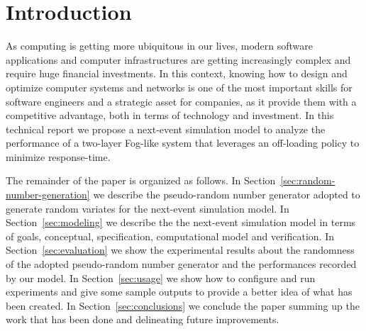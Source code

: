 \section{Introduction}
\label{sec:introduction}


As computing is getting more ubiquitous in our lives, modern software applications and computer infrastructures are getting increasingly complex and require huge financial investments.
%
In this context, knowing how to design and optimize computer systems and networks is one of the most important skills for software engineers and a strategic asset for companies, as it provide them with a competitive advantage, both in terms of technology and investment.
%
In this technical report we propose a next-event simulation model to analyze the performance of a two-layer Fog-like system that leverages an off-loading policy to minimize response-time.


The remainder of the paper is organized as follows.
%
In Section~\ref{sec:random-number-generation} we describe the pseudo-random number generator adopted to generate random variates for the next-event simulation model.
%
In Section~\ref{sec:modeling} we describe the the next-event simulation model in terms of goals, conceptual, specification, computational model and verification.
%
In Section~\ref{sec:evaluation} we show the experimental results about the randomness of the adopted pseudo-random number generator and the performances recorded by our model.
%
In Section~\ref{sec:usage} we show how to configure and run experiments and give some sample outputs to provide a better idea of what has been created.
%
In Section~\ref{sec:conclusions} we conclude the paper summing up the work that has been done and delineating future improvements.
